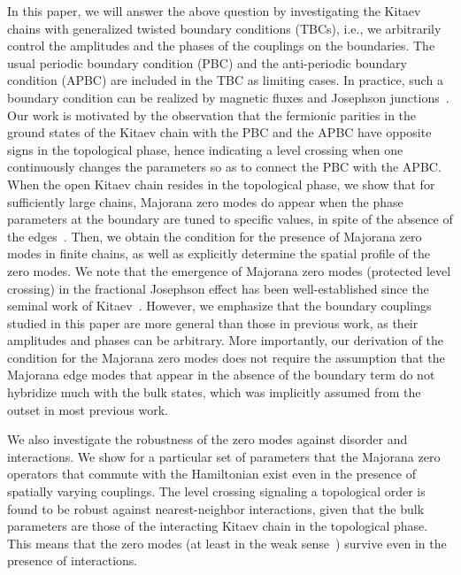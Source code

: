 \documentclass[aps, prb, showpacs, twocolumn, %
amssymb,superscriptaddress]{revtex4}
\begin{document}
In this paper, we will answer the above question by investigating the Kitaev chains with generalized twisted boundary conditions (TBCs), i.e., we arbitrarily control the amplitudes and the phases of the couplings on the boundaries. The usual periodic boundary condition (PBC) and the anti-periodic boundary condition (APBC) are included in the TBC as limiting cases. In practice, such a boundary condition can be realized by magnetic fluxes and Josephson junctions~\cite{Kitaev01, Kwon04, Fu-09, Jiang-11, San-Jose12, Rokhinson-12, Deng-12, Deng-13, Beenakker-13-Josephson, Hansen-16, Marra-16, Alase-16, Dmytruk-16, Giuliano-16, Cobanera-16}. Our work is motivated by the observation that the fermionic parities in the ground states of the Kitaev chain with the PBC and the APBC have opposite signs in the topological phase, hence indicating a level crossing when one continuously changes the parameters so as to connect the PBC with the APBC. When the open Kitaev chain resides in the topological phase, we show that for sufficiently large chains, Majorana zero modes do appear when the phase parameters at the boundary are tuned to 
specific values, in spite of the absence of the edges~\cite{def_Majorana_zero}. 
Then, we obtain the condition for the presence of Majorana zero modes in finite chains, as well as explicitly determine the spatial profile of the zero modes. 
We note that the emergence of Majorana zero modes (protected level crossing) in the fractional Josephson effect has been well-established since the seminal work of Kitaev~\cite{Kitaev01, Jiang-11, Alicea12, Alase-16, Dmytruk-16, Giuliano-16}. However, we emphasize that the boundary couplings studied in this paper are more general than those in previous work, as their amplitudes and phases can be arbitrary. More importantly, our derivation of the condition for the Majorana zero modes does not require the assumption that the Majorana edge modes that appear in the absence of the boundary term do not hybridize much with the bulk states, which was implicitly assumed from the outset in most previous work.

We also investigate the robustness of the zero modes against disorder and interactions. We show for a particular set of parameters that the Majorana zero operators that commute with the Hamiltonian exist even in the presence of spatially varying couplings. The level crossing signaling a topological order is found to be robust against nearest-neighbor %
interactions, given that the bulk parameters are those of the interacting Kitaev chain in the topological phase. This means that the zero modes (at least in the weak sense~\cite{Alicea-16}) survive even in the presence of interactions. 
\end{document}
